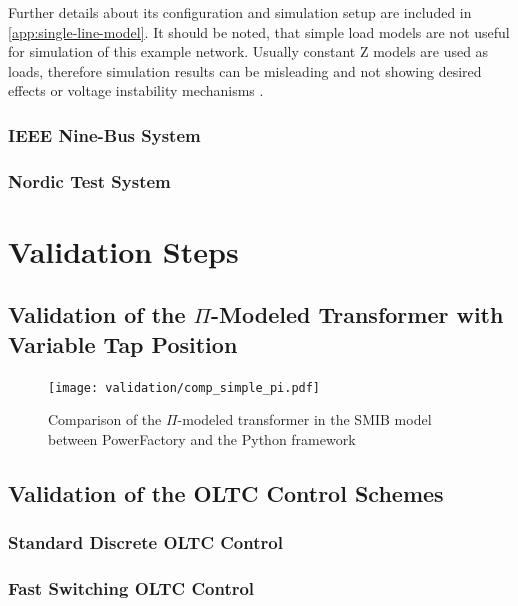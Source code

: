 Further details about its configuration and simulation setup are included in \autoref{app:single-line-model}. It should be noted, that simple load models are not useful for simulation of this example network. Usually constant Z models are used as loads, therefore simulation results can be misleading and not showing desired effects or voltage instability mechanisms \quelle. 

\subsubsection{IEEE Nine-Bus System}

\subsubsection{Nordic Test System}

\section{Validation Steps}

\subsection{Validation of the $\Pi$-Modeled Transformer with Variable Tap Position}

\begin{figure}[htb!]
    \centering
    \texttt{[image: validation/comp\_simple\_pi.pdf]}
    \caption{Comparison of the $\Pi$-modeled transformer in the \acs{SMIB} model between PowerFactory and the Python framework}
    \label{fig:comp-simple-pi}
\end{figure}

\subsection{Validation of the OLTC Control Schemes}

\subsubsection{Standard Discrete OLTC Control}

\subsubsection{Fast Switching OLTC Control}


